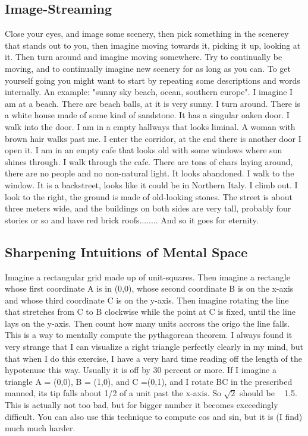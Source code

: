 \subsection{Image-Streaming}
Close your eyes, and image some scenery, then pick something in the scenerey that stands out to you, then imagine moving towards it, picking it up, looking at it. Then turn around and imagine moving somewhere. Try to continually be moving, and to continually imagine new scenery for as long as you can. To get yourself going you might want to start by repeating some descriptions and words internally. An example: "sunny sky beach, ocean, southern europe". I imagine I am at a beach. There are beach balls, at it is very sunny. I turn around. There is a white house made of some kind of sandstone. It has a singular oaken door. I walk into the door. I am in a empty hallways that looks liminal. A woman with brown hair walks past me. I enter the corridor, at the end there is another door I open it. I am in an empty cafe that looks old with some windows where sun shines through. I walk through the cafe. There are tons of chars laying around, there are no people and no non-natural light. It looks abandoned. I walk to the window. It is a backstreet, looks like it could be in Northern Italy. I climb out. I look to the right, the ground is made of old-looking stones. The street is about three meters wide, and the buildings on both sides are very tall, probably four stories or so and have red brick roofs........ And so it goes for eternity.
\par
\subsection{Sharpening Intuitions of Mental Space}
Imagine a rectangular grid made up of unit-squares. Then imagine a rectangle whose first coordinate A is in (0,0), whose second coordinate B is on the x-axis and whose third coordinate C is on the y-axis. Then imagine rotating the line that stretches from C to B clockwise while the point at C is fixed, until the line lays on the y-axis. Then count how many units accross the origo the line falls. This is a way to mentally compute the pythagorean theorem. I always found it very strange that I can visualize a right triangle perfectly clearly in my mind, but that when I do this exercise, I have a very hard time reading off the length of the hypotenuse this way. Usually it is off by 30 percent or more. If I imagine a triangle A = (0,0), B = (1,0), and C =(0,1), and I rotate BC in the prescribed manned, its tip falls about 1/2 of a unit past the x-axis. So $\sqrt{2}$ should be ~ 1.5. This is actually not too bad, but for bigger number it becomes exceedingly difficult. You can also use this technique to compute cos and sin, but it is (I find) much much harder.


